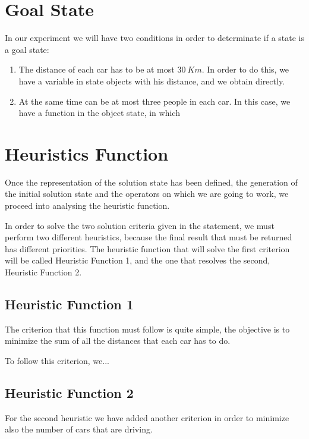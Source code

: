 \documentclass[12]{article}
\begin{document}
\section{Goal State}

In our experiment we will have two conditions in order to determinate if a state is a goal state:

\begin{enumerate}
  \item The distance of each car has to be at most $30\ Km$. In order to do this, we have a variable in state objects with his distance, and we obtain directly.
  \item At the same time can be at most three people in each car. In this case, we have a function in the object state, in which 
\end{enumerate}

\section{Heuristics Function}
Once the representation of the solution state has been defined, the generation of the initial solution state and the operators on which we are going to work, we proceed into analysing the heuristic function. 

In order to solve the two solution criteria given in the statement, we must perform two different heuristics, because the final result that must be returned has different priorities. The heuristic function that will solve the first criterion will be called Heuristic Function 1, and the one that resolves the second, Heuristic Function 2. 

\subsection{Heuristic Function 1}

The criterion that this function must follow is quite simple, the objective is to minimize the sum of all the distances that each car has to do.

To follow this criterion, we...

\subsection{Heuristic Function 2}

For the second heuristic we have added another criterion in order to minimize also the number of cars that are driving. 
\end{document}
